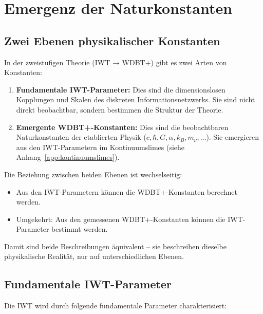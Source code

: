 
\chapter{Emergenz der Naturkonstanten}
\label{ch:naturkonstanten}

\section{Zwei Ebenen physikalischer Konstanten}
\label{sec:konstanten_ebenen}

In der zweistufigen Theorie (IWT → WDBT+) gibt es zwei Arten von Konstanten:

\begin{enumerate}
    \item \textbf{Fundamentale IWT-Parameter:}  
    Dies sind die dimensionslosen Kopplungen und Skalen des diskreten Informationsnetzwerks. Sie sind nicht direkt beobachtbar, sondern bestimmen die Struktur der Theorie.
    
    \item \textbf{Emergente WDBT+-Konstanten:}  
    Dies sind die beobachtbaren Naturkonstanten der etablierten Physik (\( c, \hbar, G, \alpha, k_B, m_\nu, \dots \)). Sie emergieren aus den IWT-Parametern im Kontinuumslimes (siehe Anhang~\ref{app:kontinuumslimes}).
\end{enumerate}

Die Beziehung zwischen beiden Ebenen ist wechselseitig:
\begin{itemize}
    \item Aus den IWT-Parametern können die WDBT+-Konstanten berechnet werden.
    \item Umgekehrt: Aus den gemessenen WDBT+-Konstanten können die IWT-Parameter bestimmt werden.
\end{itemize}

Damit sind beide Beschreibungen äquivalent – sie beschreiben dieselbe physikalische Realität, nur auf unterschiedlichen Ebenen.

\section{Fundamentale IWT-Parameter}
\label{sec:iwt_parameter}

Die IWT wird durch folgende fundamentale Parameter charakterisiert:

